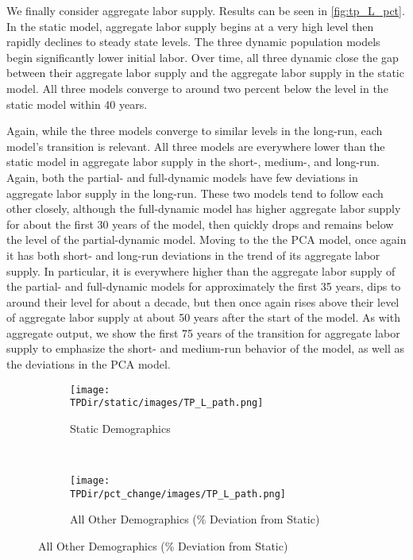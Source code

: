 \documentclass[10pt]{article}
\numberwithin{equation}{subsection}
\newcommand*{\TPDir}{../../code/Rick/OUTPUT/TP}
\begin{document}
\par We finally consider aggregate labor supply. Results can be seen in \autoref{fig:tp_L_pct}. In the static model, aggregate labor supply begins at a very high level then rapidly declines to steady state levels. The three dynamic population models begin significantly lower initial labor. Over time, all three dynamic close the gap between their aggregate labor supply and the aggregate labor supply in the static model. All three models converge to around two percent below the level in the static model within 40 years.

\par Again, while the three models converge to similar levels in the long-run, each model's transition is relevant. All three models are everywhere lower than the static model in aggregate labor supply in the \mbox{short-,} \mbox{medium-,} and long-run. Again, both the partial- and full-dynamic models have few deviations in aggregate labor supply in the long-run. These two models tend to follow each other closely, although the full-dynamic model has higher aggregate labor supply for about the first 30 years of the model, then quickly drops and remains below the level of the partial-dynamic model. Moving to the the PCA model, once again it has both short- and long-run deviations in the trend of its aggregate labor supply. In particular, it is everywhere higher than the aggregate labor supply of the partial- and full-dynamic models for approximately the first 35 years, dips to around their level for about a decade, but then once again rises above their level of aggregate labor supply at about 50 years after the start of the model. As with aggregate output, we show the first 75 years of the transition for aggregate labor supply to emphasize the short- and medium-run behavior of the model, as well as the deviations in the PCA model.

\begin{figure}[H]
   \caption{\label{fig:tp_L_pct}Time Path of Aggregate Labor Supply \(\hat{L}_t\)}
   \begin{subfigure}{0.5\textwidth}
      \centering
      \texttt{[image: \\TPDir/static/images/TP\_L\_path.png]}
      \caption{Static Demographics}
   \end{subfigure}%
   ~
   \begin{subfigure}{0.5\textwidth}
      \centering
      \texttt{[image: \\TPDir/pct\_change/images/TP\_L\_path.png]}
      \caption{All Other Demographics (\% Deviation from Static)}
   \end{subfigure}
\end{figure}
\end{document}
